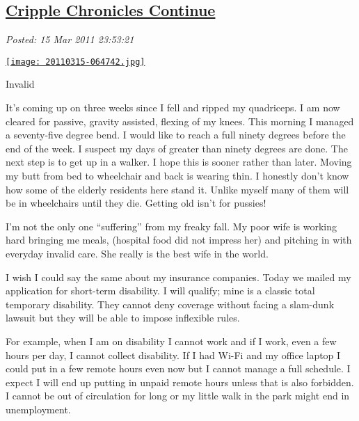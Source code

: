 %

\subsection*{\href{https://bakerjd99.wordpress.com/2011/03/15/cripple-chronicles-continue-2/}{Cripple Chronicles Continue}}


\noindent\emph{Posted: 15 Mar 2011 23:53:21}
\vspace{6pt}



\begin{floatingfigure}[r]{0.25\textwidth}
\centering
\href{http://bakerjd99.files.wordpress.com/2011/03/20110315-064742.jpg}{\texttt{[image: 20110315-064742.jpg]}}
\caption{Invalid}
\label{fig:1202X1}
\end{floatingfigure}It's coming up on three weeks since I fell and ripped my quadriceps. I
am now cleared for passive, gravity assisted, flexing of my knees. This
morning I managed a seventy-five degree bend. I would like to reach a
full ninety degrees before the end of the week. I suspect my days of
greater than ninety degrees are done. The next step is to get up in a
walker. I hope this is sooner rather than later. Moving my butt from bed
to wheelchair and back is wearing thin. I honestly don't know how some
of the elderly residents here stand it. Unlike myself many of them will
be in wheelchairs until they die. Getting old isn't for pussies!

I'm not the only one ``suffering'' from my freaky fall. My poor wife is
working hard bringing me meals, (hospital food did not impress her) and
pitching in with everyday invalid care. She really is the best wife in
the world.

I wish I could say the same about my insurance companies. Today we
mailed my application for short-term disability. I will qualify; mine is
a classic total temporary disability. They cannot deny coverage without
facing a slam-dunk lawsuit but they will be able to impose inflexible
rules.

For example, when I am on disability I cannot work and if I work, even a
few hours per day, I cannot collect disability. If I had Wi-Fi and my
office laptop I could put in a few remote hours even now but I cannot
manage a full schedule. I expect I will end up putting in unpaid remote
hours unless that is also forbidden. I cannot be out of circulation for
long or my little walk in the park might end in unemployment.



